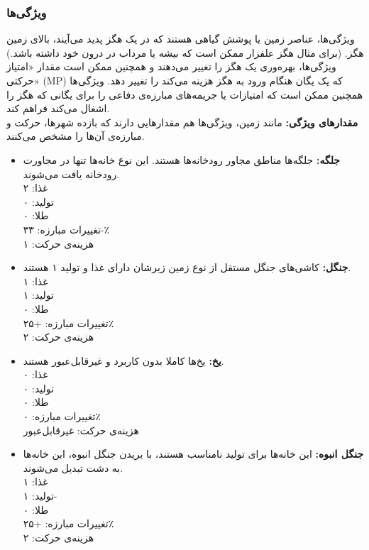\documentclass[]{article}
\begin{document}
\subsubsection*{{\titr ویژگی‌ها}}
ویژگی‌ها، عناصر زمین یا پوشش گیاهی هستند که در یک هگز پدید می‌آیند، بالای زمین هگز. (برای مثال هگز علفزار ممکن است که بیشه یا مرداب در درون خود داشته باشد.) ویژگی‌ها، بهره‌وری یک هگز را تغییر می‌دهند و همچنین ممکن است مقدار «امتیاز حرکتی» (MP) که یک یگان هنگام ورود به هگز هزینه می‌کند را تغییر دهد. ویژگی‌ها همچنین ممکن است که امتیازات یا جریمه‌های مبارزه‌ی دفاعی را برای یگانی که هگز را اشغال می‌کند فراهم کند.
\\\noindent \textbf{مقدارهای ویژگی:} مانند زمین، ویژگی‌ها هم مقدارهایی دارند که بازده شهرها، حرکت و مبارزه‌ی آن‌ها را مشخص می‌کنند.
\newpage
\begin{itemize}
	\item \textbf{جلگه:} جلگه‌ها مناطق مجاور رودخانه‌ها هستند. این نوع خانه‌ها تنها در مجاورت رودخانه یافت می‌شوند.\\
	غذا: ۲\\
تولید: ۰\\
طلا: ۰\\
تغییرات مبارزه: ۳۳-٪\\
هزینه‌ی حرکت: ۱\\
	\item \textbf{جنگل:} کاشی‌های جنگل مستقل از نوع زمین زیرشان دارای غذا و تولید ۱ هستند.\\
	غذا: ۱\\
	تولید: ۱\\
	طلا: ۰\\
	تغییرات مبارزه: +۲۵٪\\
	هزینه‌ی حرکت: ۲
	\item \textbf{یخ:} یخ‌ها کاملا بدون کاربرد و غیرقابل‌عبور هستند.\\
	غذا: ۰\\
	تولید: ۰\\
	طلا: ۰\\
	تغییرات مبارزه: ۰٪\\
	هزینه‌ی حرکت: غیرقابل‌عبور
	\item \textbf{جنگل انبوه:} این خانه‌ها برای تولید نامناسب هستند، با بریدن جنگل انبوه، این خانه‌ها به دشت تبدیل می‌شوند.\\
	غذا: ۱\\
	تولید: ۱-\\
	طلا: ۰\\
	تغییرات مبارزه: +۲۵٪\\
	هزینه‌ی حرکت: ۲

\end{itemize}
\end{document}
